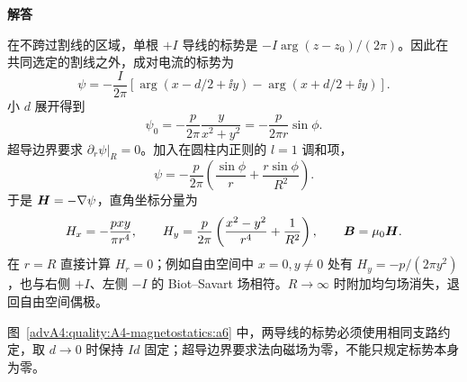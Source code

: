 \begin{advsolution}
\begin{center}\begin{minipage}{.96\linewidth}\centering
\raggedright{\bfseries\color{DeepBlue}解答}\par\smallskip\centering

\label{advA4:quality:A4-magnetostatics:a6}
\end{minipage}\end{center}

在不跨过割线的区域，单根 $+I$ 导线的标势是
$-I\arg(z-z_0)/(2\pi)$。因此在共同选定的割线之外，成对电流的标势为
\[
 \boxed{\psi=-\frac I{2\pi}
 [\arg(x-d/2+\ii y)-\arg(x+d/2+\ii y)]}.
\]
小 $d$ 展开得到
\[
 \boxed{\psi_0=-\frac p{2\pi}\frac y{x^2+y^2}
 =-\frac p{2\pi r}\sin\phi}.
\]
超导边界要求 $\partial_r\psi|_{R}=0$。加入在圆柱内正则的 $l=1$ 调和项，
\[
 \boxed{\psi=-\frac p{2\pi}\left(\frac{\sin\phi}{r}
 +\frac{r\sin\phi}{R^2}\right)}.
\]
于是 $\bm{H}=-\nabla\psi$，直角坐标分量为
\[
 H_x=-\frac{pxy}{\pi r^4},
 \qquad
 H_y=\frac p{2\pi}\left(\frac{x^2-y^2}{r^4}+\frac1{R^2}\right),
 \qquad \bm{B}=\mu_0\bm{H}.
\]
在 $r=R$ 直接计算 $H_r=0$；例如自由空间中 $x=0,y\ne0$ 处有 $H_y=-p/(2\pi y^2)$，也与右侧 $+I$、左侧 $-I$ 的 Biot--Savart 场相符。$R\to\infty$ 时附加均匀场消失，退回自由空间偶极。

图~\ref{advA4:quality:A4-magnetostatics:a6} 中，两导线的标势必须使用相同支路约定，取 $d\to0$ 时保持 $Id$ 固定；超导边界要求法向磁场为零，不能只规定标势本身为零。
\end{advsolution}


